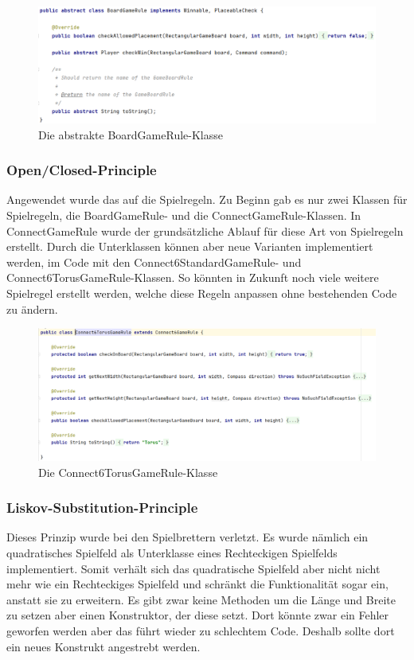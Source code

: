 \documentclass[12pt]{article}
\begin{document}
\begin{figure}[H]
\centering
\includegraphics[width=13cm]{Bilder/BoardGameRule}
\caption{Die abstrakte BoardGameRule-Klasse}
\label{fig:boardGR}
\end{figure}



\subsubsection{Open/Closed-Principle}
Angewendet wurde das auf die Spielregeln. Zu Beginn gab es nur zwei Klassen für Spielregeln, die BoardGameRule- und die ConnectGameRule-Klassen. In ConnectGameRule wurde der grundsätzliche Ablauf für diese Art von Spielregeln erstellt. Durch die Unterklassen können aber neue Varianten implementiert werden, im Code mit den Connect6StandardGameRule- und Connect6TorusGameRule-Klassen. So könnten in Zukunft noch viele weitere Spielregel erstellt werden, welche diese Regeln anpassen ohne bestehenden Code zu ändern.

\begin{figure}[H]
\centering
\includegraphics[width=13cm]{Bilder/Torus}
\caption{Die Connect6TorusGameRule-Klasse}
\label{fig:torus}
\end{figure}



\subsubsection{Liskov-Substitution-Principle}
Dieses Prinzip wurde bei den Spielbrettern verletzt. Es wurde nämlich ein quadratisches Spielfeld als Unterklasse eines Rechteckigen Spielfelds implementiert. Somit verhält sich das quadratische Spielfeld aber nicht nicht mehr wie ein Rechteckiges Spielfeld und schränkt die Funktionalität sogar ein, anstatt sie zu erweitern.
Es gibt zwar keine Methoden um die Länge und Breite zu setzen aber einen Konstruktor, der diese setzt. Dort könnte zwar ein Fehler geworfen werden aber das führt wieder zu \glqq schlechtem \grqq Code. Deshalb sollte dort ein neues Konstrukt angestrebt werden.
\end{document}
